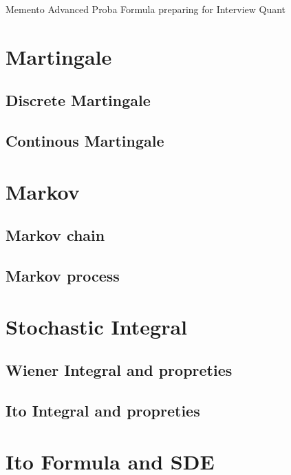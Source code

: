 \documentclass[a4paper,10pt]{article}
\begin{document}
\begin{center}Memento Advanced Proba Formula preparing for Interview Quant\end{center}
\section{Martingale}
\subsection{Discrete Martingale}
\subsection{Continous Martingale}
\section{Markov}
\subsection{Markov chain}
\subsection{Markov process}
\section{Stochastic Integral}
\subsection{Wiener Integral and propreties}
\subsection{Ito Integral and propreties}
\section{Ito Formula and SDE}
%
%
\end{document}
